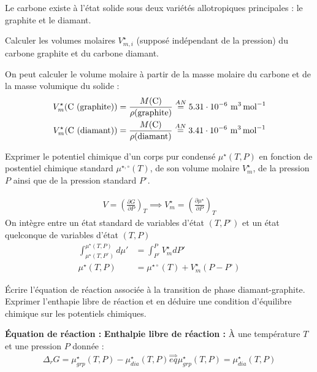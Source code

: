 
\begin{exercise}


Le carbone existe à l'état solide sous deux variétés allotropiques principales : le graphite et le diamant.

\begin{questions}
\question Calculer les volumes molaires $V^\star_{m,i}$ (supposé indépendant de la pression) du carbone graphite et du carbone diamant.
\begin{solution}

On peut calculer le volume molaire à partir de la masse molaire du carbone et de la masse volumique du solide : 
\begin{align*}
V_m^\star (\text{C (graphite)} ) &= \frac{M( \ce{C} )}{\rho ( \text{graphite} )} \stackrel{AN}{=} 5.31 \cdot 10^{-6} ~ \si{\meter\cubed\per\mole} \\
V_m^\star (\text{C (diamant)} ) &= \frac{M( \ce{C} )}{\rho ( \text{diamant} )} \stackrel{AN}{=} 3.41 \cdot 10^{-6} ~ \si{\meter\cubed\per\mole} \\
\end{align*}
\end{solution}

\question Exprimer le potentiel chimique d'un corps pur condensé $\mu^\star (T,P)$ en fonction de postentiel chimique standard $\mu^{\star, \circ}(T)$, de son volume molaire $V^\star_{m}$, de la pression $P$ ainsi que de la pression standard $P^\circ$.
\begin{solution}
\begin{align*}
V = \left( \frac{\partial G}{\partial P} \right)_{T} \implies V^\star_m = \left( \frac{\partial \mu^\star}{\partial P} \right)_{T}
\end{align*}
On intègre entre un état standard de variables d'état $(T, P^\circ)$ et un état quelconque de variables d'état $(T,P)$
\begin{align*}
\int_{\mu^\star (T, P^\circ)}^{\mu^\star (T, P)} d\mu' &= \int_{P^\circ}^P V^\star_m dP' \\
\mu^\star (T, P) &= \mu^{\star \circ} (T) +  V^\star_m (P - P^\circ)
\end{align*}
\end{solution}

\question \'{E}crire l'équation de réaction associée à la transition de phase diamant-graphite. Exprimer l'enthapie libre de réaction et en déduire une condition d'équilibre chimique sur les potentiels chimiques.
\begin{solution}
\textbf{\'{E}quation de réaction : } 
\textbf{Enthalpie libre de réaction : } \`{A} une température $T$ et une pression $P$ donnée :
\begin{align*}
\Delta_r G = \mu^\star_{grp} (T,P) - \mu^\star_{dia}(T,P) \stackrel{\implies}{eq} \mu^\star_{grp} (T,P) = \mu^\star_{dia} (T,P)
\end{align*}
\end{solution}


\end{questions}
\end{exercise}
